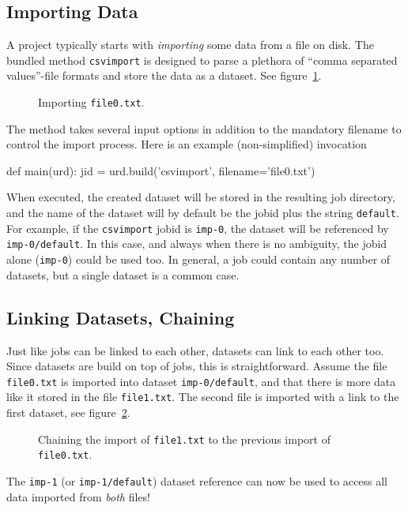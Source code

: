 \subsection{Importing Data}

A project typically starts with \textsl{importing} some data from a
file on disk.  The bundled method \texttt{csvimport} is designed to
parse a plethora of ``comma separated values''-file formats and store
the data as a dataset.  See figure~\ref{fig:dataset_csvimport}.
\begin{figure}[h!]
  \begin{center}
    
    \caption{Importing \texttt{file0.txt}.}
    \label{fig:dataset_csvimport}
  \end{center}
\end{figure}
The method takes several input options in addition to the mandatory
filename to control the import process.  Here is an example
(non-simplified) invocation
\begin{python}
def main(urd):
    jid = urd.build('csvimport', filename='file0.txt')
\end{python}
When executed, the created dataset will be stored in the resulting job
directory, and the name of the dataset will by default be the jobid
plus the string \texttt{default}.  For example, if the
\texttt{csvimport} jobid is \texttt{imp-0}, the dataset will be
referenced by \texttt{imp-0/default}.  In this case, and always when
there is no ambiguity, the jobid alone (\texttt{imp-0}) could be used
too.  In general, a job could contain any number of datasets, but a
single dataset is a common case.




\subsection{Linking Datasets, Chaining}

Just like jobs can be linked to each other, datasets can link to each
other too.  Since datasets are build on top of jobs, this is
straightforward.  Assume the file \texttt{file0.txt} is imported into
dataset \texttt{imp-0/default}, and that there is more data like it
stored in the file \texttt{file1.txt}.  The second file is imported
with a link to the first dataset, see
figure~\ref{fig:dataset_csvimport_chain}.
\begin{figure}[h!]
  \begin{center}
    
    \caption{Chaining the import of \texttt{file1.txt} to the previous
      import of \texttt{file0.txt}.}
    \label{fig:dataset_csvimport_chain}
  \end{center}
\end{figure}
The \texttt{imp-1} (or \texttt{imp-1/default}) dataset reference can
now be used to access all data imported from \textsl{both} files!

